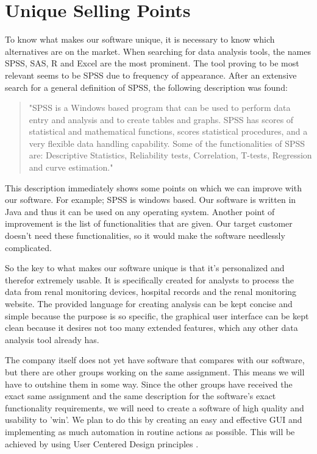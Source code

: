 \documentclass[a4paper]{article}
\begin{document}
\section{Unique Selling Points}
To know what makes our software unique, it is necessary to know which alternatives are on the market. When searching for data analysis tools, the names SPSS, SAS, R and Excel are the most prominent. The tool proving to be most relevant seems to be SPSS due to frequency of appearance. After an extensive search for a general definition of SPSS, the following description was found: 
\begin{quotation}
"SPSS is a Windows based program that can be used to perform data entry and analysis
and to create tables and graphs. SPSS has scores of statistical and mathematical functions,
scores statistical procedures, and a very flexible data handling capability. Some of the
functionalities of SPSS are: Descriptive Statistics, Reliability tests, Correlation, T-tests,
Regression and curve estimation." \cite{SPSS}
\end{quotation}
\par 
This description immediately shows some points on which we can improve with our software. For example; SPSS is windows based. Our software is written in Java and thus it can be used on any operating system. Another point of improvement is the list of functionalities that are given. Our target customer doesn't need these functionalities, so it would make the software needlessly complicated.
\par
So the key to what makes our software unique is that it's personalized and therefor extremely usable. It is specifically created for analysts to process the data from renal monitoring devices, hospital records and the renal monitoring website. The provided language for creating analysis can be kept concise and simple because the purpose is so specific, the graphical user interface can be kept clean because it desires not too many extended features, which any other data analysis tool already has. 
\par 
The company itself does not yet have software that compares with our software, but there are other groups working on the same assignment. This means we will have to outshine them in some way. Since the other groups have received the exact same assignment and the same description for the software's exact functionality requirements, we will need to create a software of high quality and usability to 'win'. We plan to do this by creating an easy and effective GUI and implementing as much automation in routine actions as possible. This will be achieved by using User Centered Design principles \cite{Nielsen}.
\end{document}
